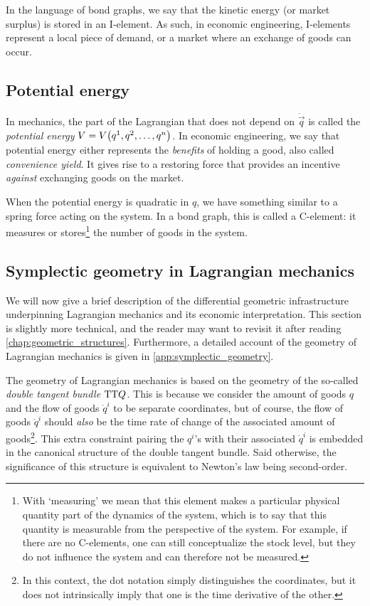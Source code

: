 In the language of bond graphs, we say that the kinetic energy (or market surplus) is stored in an I-element. As such, in economic engineering, I-elements represent a local piece of demand, or a market where an exchange of goods can occur.

\subsection{Potential energy} In mechanics, the part of the Lagrangian that does not depend on \(\dot{\vec{q}}\) is called the \emph{potential energy} \(V = V\qty(q^1, q^2, \ldots, q^n)\). In economic engineering, we say that potential energy either represents the \emph{benefits} of holding a good, also called \emph{convenience yield}. It gives rise to a restoring force that provides an incentive \emph{against} exchanging goods on the market.  

When the potential energy is quadratic in \(q\), we have something similar to a spring force acting on the system. In a bond graph, this is called a C-element: it measures or stores\footnote{With `measuring' we mean that this element makes a particular physical quantity part of the dynamics of the system, which is to say that this quantity is measurable from the perspective of the system. For example, if there are no C-elements, one can still conceptualize the stock level, but they do not influence the system and can therefore not be measured.} the number of goods in the system.

\subsection{Symplectic geometry in Lagrangian mechanics} 
We will now give a brief description of the differential geometric infrastructure underpinning Lagrangian mechanics and its economic interpretation. This section is slightly more technical, and the reader may want to revisit it after reading \cref{chap:geometric_structures}. 
Furthermore, a detailed account of the geometry of Lagrangian mechanics is given in  \cref{app:symplectic_geometry}. 

The geometry of Lagrangian mechanics is based on the geometry of the so-called \emph{double tangent bundle} \(\mathrm{T}\mathrm{T}Q\). This is because we consider the amount of goods \(q\) and the flow of goods \(\dot{q}^i\) to be separate coordinates, but of course, the flow of goods \(\dot{q}^i\) should \emph{also} be the time rate of change of the associated amount of goods\footnote{In this context, the dot notation simply distinguishes the coordinates, but it does not intrinsically imply that one is the time derivative of the other.}. This extra constraint pairing the \(q^i\)'s with their associated \(\dot{q}^i\) is embedded in the canonical structure of the double tangent bundle. Said otherwise, the significance of this structure is equivalent to Newton's law being second-order.

